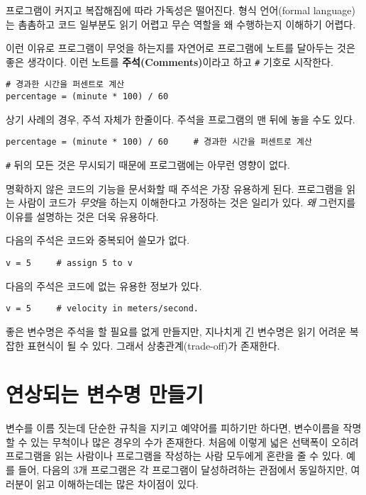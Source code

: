 프로그램이 커지고 복잡해짐에 따라 가독성은 떨어진다. 형식 언어(formal language)는 촘촘하고 코드 일부분도 읽기 어렵고 무슨 역할을 왜 수행하는지 이해하기 어렵다.

이런 이유로 프로그램이 무엇을 하는지를 자연어로 프로그램에 노트를 달아두는 것은 좋은 생각이다. 
이런 노트를 {\bf 주석(Comments)}이라고 하고 \verb"#" 기호로 시작한다.

\beforeverb
\begin{verbatim}
# 경과한 시간을 퍼센트로 계산
percentage = (minute * 100) / 60
\end{verbatim}
\afterverb
%
상기 사례의 경우, 주석 자체가 한줄이다. 주석을 프로그램의 맨 뒤에 놓을 수도 있다.

\beforeverb
\begin{verbatim}
percentage = (minute * 100) / 60     # 경과한 시간을 퍼센트로 계산
\end{verbatim}
\afterverb
%

{\tt \#} 뒤의 모든 것은 무시되기 때문에 프로그램에는 아무런 영향이 없다.

명확하지 않은 코드의 기능을 문서화할 때 주석은 가장 유용하게 된다.
프로그램을 읽는 사람이 코드가 \emph{무엇}을 하는지 이해한다고 가정하는 것은 일리가 있다.
\emph{왜} 그런지를 이유를 설명하는 것은 더욱 유용하다.

다음의 주석은 코드와 중복되어 쓸모가 없다.

\beforeverb
\begin{verbatim}
v = 5     # assign 5 to v
\end{verbatim}
\afterverb
%

다음의 주석은 코드에 없는 유용한 정보가 있다.

\beforeverb
\begin{verbatim}
v = 5     # velocity in meters/second. 
\end{verbatim}
\afterverb
%
좋은 변수명은 주석을 할 필요를 없게 만들지만, 지나치게 긴 변수명은 읽기 어려운 복잡한 표현식이 될 수 있다. 그래서 상충관계(trade-off)가 존재한다.

\section{연상되는 변수명 만들기}


변수를 이름 짓는데 단순한 규칙을 지키고 예약어를 피하기만 하다면, 변수이름을 작명할 수 있는 무척이나 많은 경우의 수가 존재한다. 
처음에 이렇게 넓은 선택폭이 오히려 프로그램을 읽는 사람이나 프로그램을 작성하는 사람 모두에게 혼란을 줄 수 있다. 
예를 들어, 다음의 3개 프로그램은 각 프로그램이 달성하려하는 관점에서 동일하지만, 여러분이 읽고 이해하는데는 많은 차이점이 있다.

